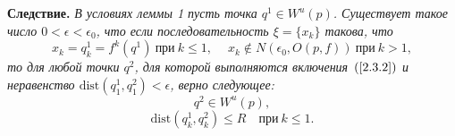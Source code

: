 \documentclass[12pt]{article}
\begin{document}
\textbf{Следствие.}\textit{ В условиях леммы 1 пусть точка $q^1\in W^u(p)$. Существует такое число $0<\epsilon<\epsilon_0$, что если последовательность $\xi=\{x_k\}$ такова, что 
\begin{equation}
\label{2.3.5}
x_k=q^1_k=f^k(q^1)\ \textrm{при}\ k\leq1,\quad\ x_k\notin N(\epsilon_0,O(p,f))\ \textrm{при}\ k>1,
\end{equation}
то для любой точки $q^2$, для которой выполняются включения~$(\ref{2.3.2})$ и неравенство $\textrm{dist}(q_1^1,q_1^2)<\epsilon$, верно следующее:
\begin{equation}
\label{2.3.6}
q^2\in W^u(p),
\end{equation}
\begin{equation}
\label{2.3.7}
\textrm{dist}(q^1_k,q^2_k)\leq R\quad\textrm{при}\ k\leq1.
\end{equation}}
\end{document}
